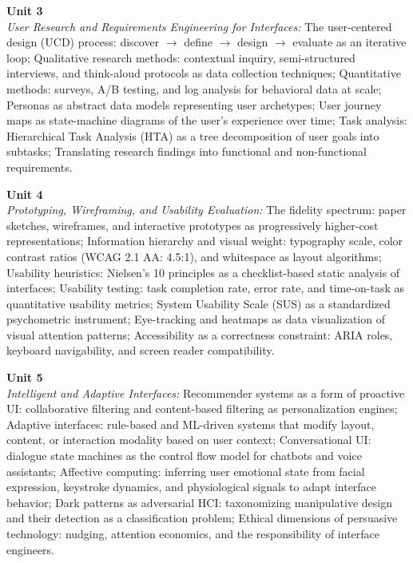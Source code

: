 \vspace{0.3cm}

\noindent\textbf{Unit 3} \\
\textit{User Research and Requirements Engineering for Interfaces:} The user-centered design (UCD) process: discover $\rightarrow$ define $\rightarrow$ design $\rightarrow$ evaluate as an iterative loop; Qualitative research methods: contextual inquiry, semi-structured interviews, and think-aloud protocols as data collection techniques; Quantitative methods: surveys, A/B testing, and log analysis for behavioral data at scale; Personas as abstract data models representing user archetypes; User journey maps as state-machine diagrams of the user's experience over time; Task analysis: Hierarchical Task Analysis (HTA) as a tree decomposition of user goals into subtasks; Translating research findings into functional and non-functional requirements.

\vspace{0.3cm}

\noindent\textbf{Unit 4} \\
\textit{Prototyping, Wireframing, and Usability Evaluation:} The fidelity spectrum: paper sketches, wireframes, and interactive prototypes as progressively higher-cost representations; Information hierarchy and visual weight: typography scale, color contrast ratios (WCAG 2.1 AA: 4.5:1), and whitespace as layout algorithms; Usability heuristics: Nielsen's 10 principles as a checklist-based static analysis of interfaces; Usability testing: task completion rate, error rate, and time-on-task as quantitative usability metrics; System Usability Scale (SUS) as a standardized psychometric instrument; Eye-tracking and heatmaps as data visualization of visual attention patterns; Accessibility as a correctness constraint: ARIA roles, keyboard navigability, and screen reader compatibility.

\vspace{0.3cm}

\noindent\textbf{Unit 5} \\
\textit{Intelligent and Adaptive Interfaces:} Recommender systems as a form of proactive UI: collaborative filtering and content-based filtering as personalization engines; Adaptive interfaces: rule-based and ML-driven systems that modify layout, content, or interaction modality based on user context; Conversational UI: dialogue state machines as the control flow model for chatbots and voice assistants; Affective computing: inferring user emotional state from facial expression, keystroke dynamics, and physiological signals to adapt interface behavior; Dark patterns as adversarial HCI: taxonomizing manipulative design and their detection as a classification problem; Ethical dimensions of persuasive technology: nudging, attention economics, and the responsibility of interface engineers.

\newpage
{}